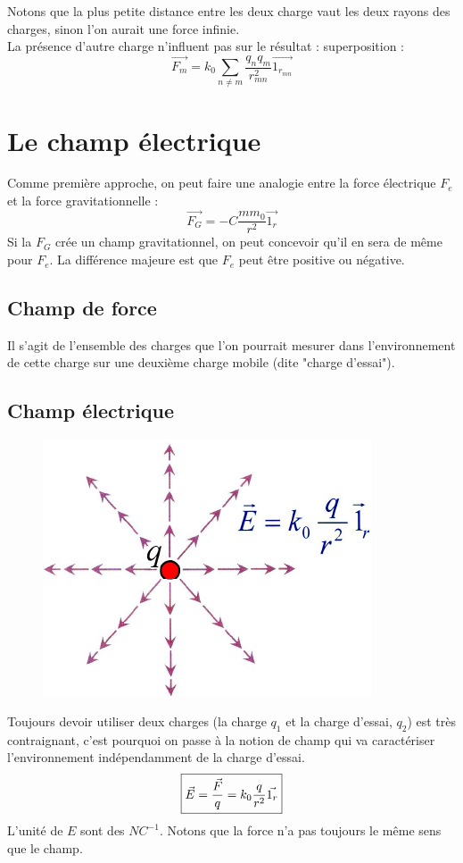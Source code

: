 \documentclass	[11pt, a4paper, openany]{book}
\begin{document}
Notons que la plus petite distance entre les deux charge vaut les deux rayons des charges, sinon l'on aurait une force infinie.\\
La présence d'autre charge n'influent pas sur le résultat :  superposition :
\begin{equation}
\vec{F_m} = k_0\sum_{n\neq m} \frac{q_nq_m}{r^2_{mn}}\vec{1_{r_{mn}}}
\end{equation}

\section{Le champ électrique}
Comme première approche, on peut faire une analogie entre la force électrique $F_e$ et la force gravitationnelle :
\begin{equation}
\vec{F_G} = -C \frac{mm_0}{r^2}\vec{1_r}
\end{equation}
Si la $F_G$ crée un champ gravitationnel, on peut concevoir qu'il en sera de même pour $F_e$. La différence majeure est que $F_e$ peut être positive ou négative.

\subsection{Champ de force}
Il s'agit de l'ensemble des charges que l'on pourrait mesurer dans l'environnement de cette charge sur une deuxième charge mobile (dite "charge d'essai").

\subsection{Champ électrique}
\begin{figure}
\includegraphics[scale=0.34]{es/image3.png}
\end{figure}
Toujours devoir utiliser deux charges (la charge $q_1$ et la charge d'essai, $q_2$) est très contraignant, c'est pourquoi on passe à la notion de champ qui va caractériser l'environnement indépendamment de la charge d'essai.
\begin{equation}
\fbox{$\vec{E} = \dfrac{\vec{F}}{q} = k_0\dfrac{q}{r^2}\vec{1_r}$}
\end{equation}
L'unité de $E$ sont des $NC^{-1}$. Notons que la force n'a pas toujours le même sens que le champ.
\end{document}
